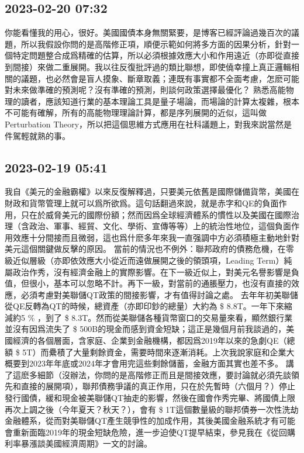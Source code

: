\documentclass[twocolumn]{ctexart}
\begin{document}
\subsection*{2023-02-20 07:32}

你能看懂我的用心，很好。美國國債本身無關緊要，是博客已經評論過幾百次的議題，所以我假設你問的是高階修正項，順便示範如何將多方面的因果分析，針對一個特定問題整合成爲精確的估算，所以必須根據效應大小和作用遠近（亦即從直接到間接）來做二重展開。我以往反復批評過的類比聯想，即使僥幸撞上真正邏輯相關的議題，也必然會是盲人摸象、斷章取義；連既有事實都不全面考慮，怎麽可能對未來做準確的預測呢？沒有準確的預測，則談何政策選擇最優化？
熟悉高能物理的讀者，應該知道行業的基本理論工具是量子場論，而場論的計算太複雜，根本不可能有確解，所有的高能物理理論計算，都是序列展開的近似，這叫做Perturbation Theory，所以把這個思維方式應用在社科議題上，對我來説當然是件駕輕就熟的事。
\subsection*{2023-02-19 05:41}

我自《美元的金融霸權》以來反復解釋過，只要美元依舊是國際儲備貨幣，美國在財政和貨幣管理上就可以爲所欲爲。這句話翻過來說，就是赤字和QE的負面作用，只在於威脅美元的國際份額；然而因爲全球經濟體系的慣性以及美國在國際治理（含政治、軍事、經貿、文化、學術、宣傳等等）上的統治性地位，這個負面作用效應十分間接而且微弱，這也爲什麽多年來我一直强調中方必須積極主動地針對美元這個關鍵做反擊的原因。
當前的情況也不例外：聯邦政府的債務危機，在零級近似層級（亦即依效應大小從近而遠做展開之後的領頭項，Leading Term）純屬政治作秀，沒有經濟金融上的實際影響。在下一級近似上，對美元名譽影響是負值，但很小，基本可以忽略不計。再下一級，對當前的通脹壓力，也沒有直接的效應，必須考慮對美聯儲QT政策的間接影響，才有值得討論之處。
去年年初美聯儲從QE反轉為QT的時候，總資產（亦即印鈔的總量）大約為 \$ 8.8T。一年下來縮減約5 \% ，到了 \$ 8.3T。然而從美聯儲各種貨幣窗口的交易量來看，顯然銀行業並沒有因爲流失了 \$ 500B的現金而感到資金短缺；這正是幾個月前我談過的，美國經濟的各個層面，含家庭、企業到金融機構，都因爲2019年以來的急劇QE（總額 \$ 5T）而纍積了大量剩餘資金，需要時間來逐漸消耗。上次我說家庭和企業大概要到2023年年底或2024年才會用完這些剩餘儲蓄，金融方面其實也差不多。
講了這麽多細節（沒辦法，你問的是高階修正而且是間接效應，要討論就必須先談領先和直接的展開項），聯邦債務爭議的真正作用，只在於先暫時（六個月？）停止發行國債，緩和現金被美聯儲QT抽走的影響，然後在國會作秀完畢、將國債上限再次上調之後（今年夏天？秋天？），會有 \$ 1T這個數量級的聯邦債券一次性洗劫金融體系，從而對美聯儲QT產生競爭性的加成作用，其後美國金融系統才有可能會重新面臨2019年的現金短缺危險，進一步迫使QT提早結束，參見我在《從回購利率暴漲談美國經濟周期》一文的討論。
\end{document}
